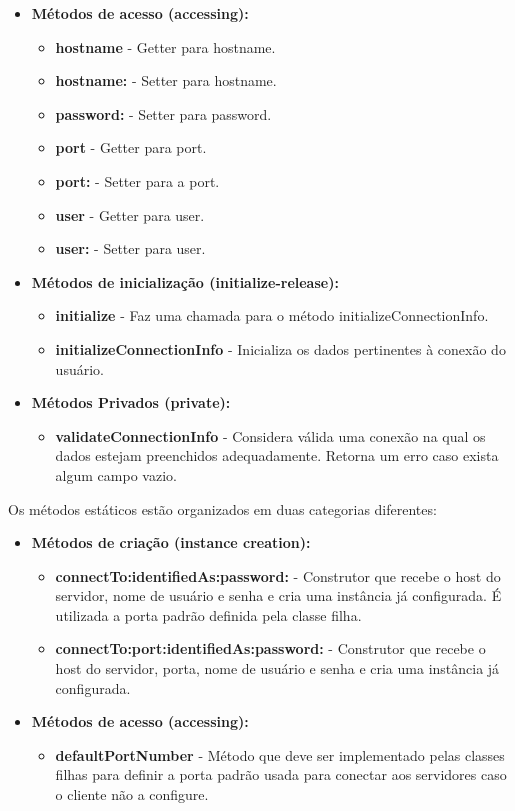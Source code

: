 \begin{itemize}
	\item \textbf{Métodos de acesso (accessing):}
	\begin{itemize}
		\item \textbf{hostname} - Getter para hostname.
		\item \textbf{hostname:} - Setter para hostname.
		\item \textbf{password:} - Setter para password.
		\item \textbf{port} - Getter para port.
		\item \textbf{port:} - Setter para a port.
		\item \textbf{user} - Getter para user.
		\item \textbf{user:} - Setter para user.
	\end{itemize}
	\item \textbf{Métodos de inicialização (initialize-release):}
	\begin{itemize}
		\item \textbf{initialize} - Faz uma chamada para o método initializeConnectionInfo.
		\item \textbf{initializeConnectionInfo} - Inicializa os dados pertinentes à conexão do usuário.
	\end{itemize}
	\item \textbf{Métodos Privados (private):}
	\begin{itemize}
		\item \textbf{validateConnectionInfo} - Considera válida uma conexão na qual os dados estejam preenchidos adequadamente. Retorna um erro caso exista algum campo vazio.
	\end{itemize}
\end{itemize}
Os métodos estáticos estão organizados em duas categorias diferentes:
\begin{itemize}
	\item \textbf{Métodos de criação (instance creation):}
	\begin{itemize}
		\item \textbf{connectTo:identifiedAs:password:} - Construtor que recebe o host do servidor, nome de usuário e senha e cria uma instância já configurada. É utilizada a porta padrão definida pela classe filha.
		\item \textbf{connectTo:port:identifiedAs:password:} - Construtor que recebe o host do servidor, porta, nome de usuário e senha e cria uma instância já configurada. 
	\end{itemize}
	\item \textbf{Métodos de acesso (accessing):}
	\begin{itemize}
		\item \textbf{defaultPortNumber} - Método que deve ser implementado pelas classes filhas para definir a porta padrão usada para conectar aos servidores caso o cliente não a configure.
	\end{itemize}
\end{itemize}

